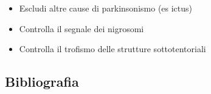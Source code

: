 \begin{itemize}[label=$\square$] %
	\item Escludi altre cause di parkinsonismo (es ictus)
	\item Controlla il segnale dei nigrosomi
	\item Controlla il trofismo delle strutture sottotentoriali
\end{itemize}

\subsection{Bibliografia}
\small{
	
	
}


